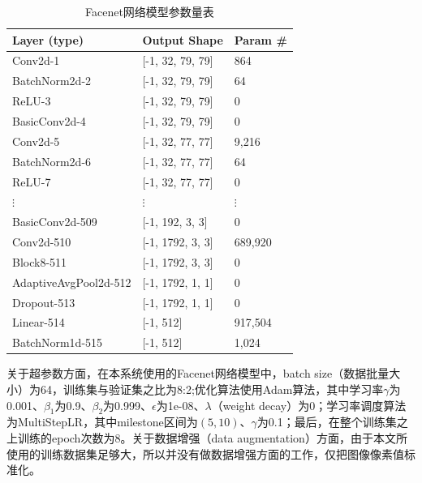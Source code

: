 \begin{table}[H]
    \centering
    \caption{Facenet网络模型参数量表}
    \label{tab:modelparams}
    \begin{tabularx}{.95\textwidth}{X<{\centering}X<{\centering}X<{\centering}}
        \toprule
        Layer (type)          & Output Shape     & Param \# \\
        \midrule
        Conv2d-1              & [-1, 32, 79, 79] & 864      \\
        BatchNorm2d-2         & [-1, 32, 79, 79] & 64       \\
        ReLU-3                & [-1, 32, 79, 79] & 0        \\
        BasicConv2d-4         & [-1, 32, 79, 79] & 0        \\
        Conv2d-5              & [-1, 32, 77, 77] & 9,216    \\
        BatchNorm2d-6         & [-1, 32, 77, 77] & 64       \\
        ReLU-7                & [-1, 32, 77, 77] & 0        \\
        $\vdots$              & $\vdots$         & $\vdots$ \\
        BasicConv2d-509       & [-1, 192, 3, 3]  & 0        \\
        Conv2d-510            & [-1, 1792, 3, 3] & 689,920  \\
        Block8-511            & [-1, 1792, 3, 3] & 0        \\
        AdaptiveAvgPool2d-512 & [-1, 1792, 1, 1] & 0        \\
        Dropout-513           & [-1, 1792, 1, 1] & 0        \\
        Linear-514            & [-1, 512]        & 917,504  \\
        BatchNorm1d-515       & [-1, 512]        & 1,024    \\
        \bottomrule
    \end{tabularx}
\end{table}

关于超参数方面，在本系统使用的Facenet网络模型中，batch size（数据批量大小）为64，训练集与验证集之比为8:2;优化算法使用Adam算法，其中学习率$\gamma$为0.001、$\beta_{1}$为0.9、$\beta_{2}$为0.999、$\epsilon$为1e-08、$\lambda$（weight decay）为0；学习率调度算法为MultiStepLR，其中milestone区间为$(5,10)$、$\gamma$为0.1；最后，在整个训练集之上训练的epoch次数为8。关于数据增强（data augmentation）方面，由于本文所使用的训练数据集足够大，所以并没有做数据增强方面的工作，仅把图像像素值标准化。

